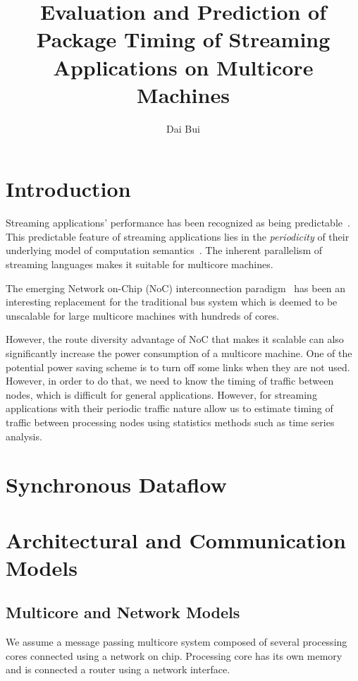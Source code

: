 \documentclass[12pt]{article}
\begin{document}
\title{Evaluation and Prediction of Package Timing of Streaming Applications on
Multicore Machines}
\author{Dai Bui}
\maketitle
\section{Introduction}
Streaming applications' performance has been recognized as being
predictable~\cite{AleenInputDriven, PoplavkoExecutionStreams,
Theelen06ScenarioAware}. This predictable feature of streaming applications
lies in the \textit{periodicity} of their underlying model of computation
semantics~\cite{LeeSDF, ThiesStreamIt, GlitiaArrayOLDelay}. The inherent
parallelism of streaming languages makes it suitable for multicore machines.

The emerging Network on-Chip (NoC) interconnection
paradigm~\cite{DallyPacketNotWire, demicheli_noc_book_2006} has been an
interesting replacement for the traditional bus system which is deemed to be
unscalable for large multicore machines with hundreds of cores.

However, the route diversity advantage of NoC that makes it scalable can also
significantly increase the power consumption of a multicore machine. One of the
potential power saving scheme is to turn off some links when they are not used.
However, in order to do that, we need to know the timing of traffic between
nodes, which is difficult for general applications. However, for streaming
applications with their periodic traffic nature allow us to estimate timing of
traffic between processing nodes using statistics methods such as time series
analysis.

 
\section{Synchronous Dataflow}
\section{Architectural and Communication Models}
\subsection{Multicore and Network Models}
We assume a message passing multicore system composed of several processing
cores connected using a network on chip. Processing core has its own memory and
is connected a router using a network interface.
\end{document}
